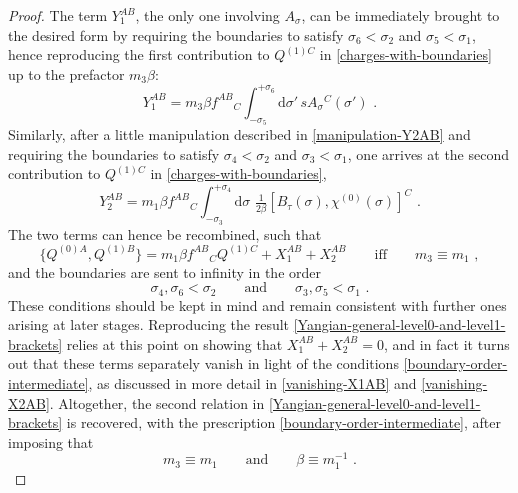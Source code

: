 \documentclass[12pt]{article}
\numberwithin{equation}{section}
\begin{document}
\begin{proof}
The term $Y_{1}^{AB}$, the only one involving $A_{\sigma}$, can be immediately brought to the desired form by requiring the boundaries to satisfy $\sigma_{6}<\sigma_{2}$ and $\sigma_{5}<\sigma_{1}$, hence reproducing the first contribution to $Q^{(1)C}$ in \eqref{charges-with-boundaries} up to the prefactor $m_{3}\beta$:
\begin{equation}
Y_{1}^{AB}=m_{3} \beta f^{AB}{}_{C} \int_{-\sigma_{5}}^{+\sigma_{6}}\mathrm{d}\sigma'
\, sA_{\sigma}{}^{C}(\sigma') \,\, .
\end{equation}
Similarly, after a little manipulation described in \eqref{manipulation-Y2AB} and requiring the boundaries to satisfy $\sigma_{4}<\sigma_{2}$ and $\sigma_{3}<\sigma_{1}$, one arrives at the second contribution to $Q^{(1)C}$ in \eqref{charges-with-boundaries},
\begin{equation}
Y_{2}^{AB}= m_{1}\beta f^{AB}{}_{C} \int_{-\sigma_{3}}^{+\sigma_{4}}\mathrm{d}\sigma \,\, \tfrac{1}{2\beta}[B_{\tau}(\sigma),\chi^{(0)}(\sigma)]^{C} \,\, .
\end{equation}
The two terms can hence be recombined, such that
\begin{equation}
\{Q^{(0)A},Q^{(1)B}\}=m_{1}\beta f^{AB}{}_{C} Q^{(1)C}+X_{1}^{AB}+X_{2}^{AB}
\qquad \text{iff} \qquad m_{3}\equiv m_{1} \,\, ,
\end{equation}
and the boundaries are sent to infinity in the order
\begin{equation}\label{boundary-order-intermediate}
\sigma_{4},\sigma_{6} <\sigma_{2}
\qquad \text{and} \qquad 
\sigma_{3},\sigma_{5}<\sigma_{1} \,\, .
\end{equation}
These conditions should be kept in mind and remain consistent with further ones arising at later stages. Reproducing the result \eqref{Yangian-general-level0-and-level1-brackets} relies at this point on showing that $X_{1}^{AB}+X_{2}^{AB}=0$, and in fact it turns out that these terms separately vanish in light of the conditions \eqref{boundary-order-intermediate}, as discussed in more detail in \eqref{vanishing-X1AB} and \eqref{vanishing-X2AB}. Altogether, the second relation in \eqref{Yangian-general-level0-and-level1-brackets} is recovered, with the prescription \eqref{boundary-order-intermediate}, after imposing that
\begin{equation}\label{all-conditions-from-Q0-Q1}
m_{3}\equiv m_{1}
\qquad \text{and} \qquad 
\beta\equiv m_{1}^{-1} \,\, .
\end{equation}


\end{proof}
\end{document}
